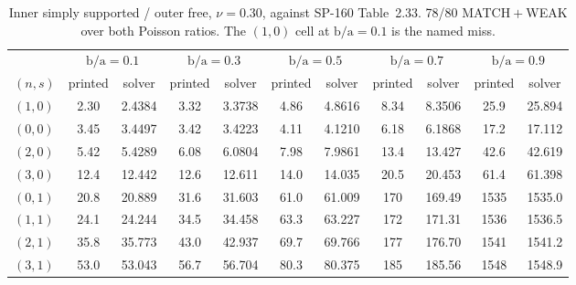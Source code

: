 \documentclass[11pt]{article}
\newcommand{\ba}{\mbox{b/a}}
\begin{document}
\begin{table}[htbp]\centering\footnotesize
\caption{Inner simply supported / outer free, $\nu=0.30$, against
SP-160 Table~2.33. 78/80 MATCH${}+{}$WEAK over both Poisson ratios.
The $(1,0)$ cell at $\ba=0.1$ is the named miss.}
\label{tab:sm-t233-nu30}
\begin{tabular}{lcccccccccc}
\toprule
& \multicolumn{2}{c}{$\ba=0.1$} & \multicolumn{2}{c}{$\ba=0.3$}
& \multicolumn{2}{c}{$\ba=0.5$} & \multicolumn{2}{c}{$\ba=0.7$}
& \multicolumn{2}{c}{$\ba=0.9$}\\
\cmidrule(lr){2-3}\cmidrule(lr){4-5}\cmidrule(lr){6-7}\cmidrule(lr){8-9}\cmidrule(lr){10-11}
$(n,s)$ & printed & solver & printed & solver & printed & solver
& printed & solver & printed & solver\\
\midrule
$(1,0)$ & 2.30 & 2.4384 & 3.32 & 3.3738 & 4.86 & 4.8616 & 8.34 & 8.3506 & 25.9 & 25.894 \\
$(0,0)$ & 3.45 & 3.4497 & 3.42 & 3.4223 & 4.11 & 4.1210 & 6.18 & 6.1868 & 17.2 & 17.112 \\
$(2,0)$ & 5.42 & 5.4289 & 6.08 & 6.0804 & 7.98 & 7.9861 & 13.4 & 13.427 & 42.6 & 42.619 \\
$(3,0)$ & 12.4 & 12.442 & 12.6 & 12.611 & 14.0 & 14.035 & 20.5 & 20.453 & 61.4 & 61.398 \\
$(0,1)$ & 20.8 & 20.889 & 31.6 & 31.603 & 61.0 & 61.009 & 170 & 169.49 & 1535 & 1535.0 \\
$(1,1)$ & 24.1 & 24.244 & 34.5 & 34.458 & 63.3 & 63.227 & 172 & 171.31 & 1536 & 1536.5 \\
$(2,1)$ & 35.8 & 35.773 & 43.0 & 42.937 & 69.7 & 69.766 & 177 & 176.70 & 1541 & 1541.2 \\
$(3,1)$ & 53.0 & 53.043 & 56.7 & 56.704 & 80.3 & 80.375 & 185 & 185.56 & 1548 & 1548.9 \\
\bottomrule
\end{tabular}
\end{table}
\end{document}
